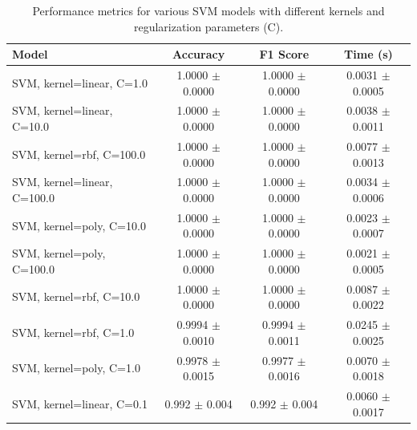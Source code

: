 \begin{table}[h!]
\centering
\begin{tabular}{|l|c|c|c|}
\hline
\textbf{Model} & \textbf{Accuracy} & \textbf{F1 Score} & \textbf{Time (s)} \\
\hline
SVM, kernel=linear, C=1.0    & 1.0000 $\pm$ 0.0000 & 1.0000 $\pm$ 0.0000 & 0.0031 $\pm$ 0.0005 \\
\hline
SVM, kernel=linear, C=10.0   & 1.0000 $\pm$ 0.0000 & 1.0000 $\pm$ 0.0000 & 0.0038 $\pm$ 0.0011 \\
\hline
SVM, kernel=rbf, C=100.0     & 1.0000 $\pm$ 0.0000 & 1.0000 $\pm$ 0.0000 & 0.0077 $\pm$ 0.0013 \\
\hline
SVM, kernel=linear, C=100.0  & 1.0000 $\pm$ 0.0000 & 1.0000 $\pm$ 0.0000 & 0.0034 $\pm$ 0.0006 \\
\hline
SVM, kernel=poly, C=10.0     & 1.0000 $\pm$ 0.0000 & 1.0000 $\pm$ 0.0000 & 0.0023 $\pm$ 0.0007 \\
\hline
SVM, kernel=poly, C=100.0    & 1.0000 $\pm$ 0.0000 & 1.0000 $\pm$ 0.0000 & 0.0021 $\pm$ 0.0005 \\
\hline
SVM, kernel=rbf, C=10.0      & 1.0000 $\pm$ 0.0000 & 1.0000 $\pm$ 0.0000 & 0.0087 $\pm$ 0.0022 \\
\hline
SVM, kernel=rbf, C=1.0       & 0.9994 $\pm$ 0.0010 & 0.9994 $\pm$ 0.0011 & 0.0245 $\pm$ 0.0025 \\
\hline
SVM, kernel=poly, C=1.0      & 0.9978 $\pm$ 0.0015 & 0.9977 $\pm$ 0.0016 & 0.0070 $\pm$ 0.0018 \\
\hline
SVM, kernel=linear, C=0.1    & 0.992 $\pm$ 0.004 & 0.992 $\pm$ 0.004 & 0.0060 $\pm$ 0.0017 \\
\hline
\end{tabular}
\caption{Performance metrics for various SVM models with different kernels and regularization parameters (C).}
\label{tab:svm_metrics_m}
\end{table}

